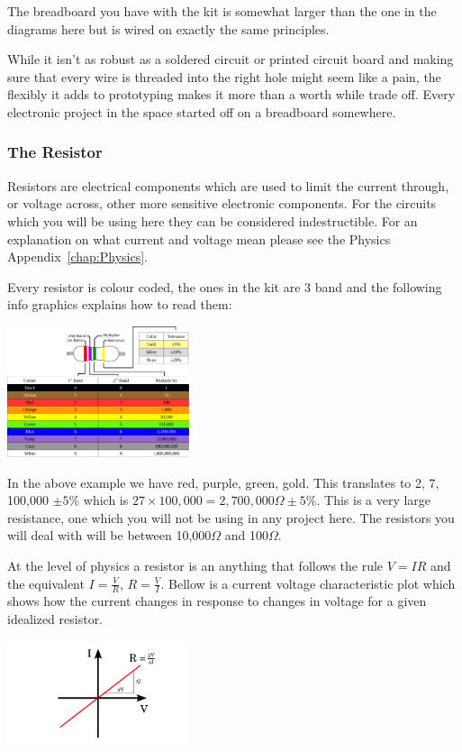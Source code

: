 The breadboard you have with the kit is somewhat larger than the one in the diagrams here but is wired on exactly the same principles.

While it isn't as robust as a soldered circuit or printed circuit board 
and making sure that every wire is threaded into the right hole might seem like a pain, 
the flexibly it adds to prototyping makes it more than a worth while trade off.
Every electronic project in the space started off on a breadboard somewhere.


\subsubsection{The Resistor}
Resistors are electrical components which are used to limit the current through, 
or voltage across,
other more sensitive electronic components.
For the circuits which you will be using here they can be considered indestructible.
For an explanation on what current and voltage mean please see the Physics Appendix~\ref{chap:Physics}.


Every resistor is colour coded,
the ones in the kit are 3 band and the following info graphics explains how to read them:
\begin{center}
    \includegraphics[width=0.4\textwidth]{./Graphics/4-Band_Resistor.pdf}
\end{center}

In the above example we have red, purple, green, gold.
This translates to 2, 7, 100,000 $\pm5\%$ which is
$27 \times 100,000 = 2,700,000 \Omega \pm5\%$.
This is a very large resistance, one which you will not be using in any project here.
The resistors you will deal with will be between 10,000$\Omega$ and 100$\Omega$.

At the level of physics a resistor is an anything that follows the rule
$V = IR$ and the equivalent $I = \frac{V}{R}$, $R = \frac{V}{I}$.
Bellow is a current voltage characteristic plot which shows how the current changes in response to changes in voltage for a given idealized resistor.

\begin{center}
    \includegraphics[width=0.4\textwidth]{./Graphics/Resistor_Characteristic}
\end{center}

